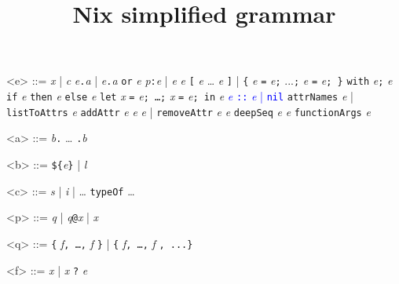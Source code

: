 \documentclass{article}
\title{Nix simplified grammar}
\date{}
\newcommand{\stx}[1]{\texttt{#1}} %
\newcommand{\meta}[1]{\emph{#1}} %
\def\e/{\meta{e}}
\def\a/{\meta{a}}
\def\b/{\meta{b}}
\def\c/{\meta{c}}
\def\p/{\meta{p}}
\def\q/{\meta{q}}
\def\f/{\meta{f}}
\def\x/{\meta{x}}
\begin{document}
\maketitle{}

\begin{grammar}
<e> ::=
    \x/ | \c/
  \alt \e/\stx{.}\a/ | \e/\stx{.}\a/ \stx{or} \e/
  \alt \p/\stx{:}\e/ | \e/ \e/
  \alt \stx{[} \e/ \ldots{} \e/ \stx{]} | \stx{\{} \e/ \stx{=} \e/\stx{;} ...\stx{;} \e/ \stx{=} \e/\stx{; \}}
  \alt \stx{with} \e/\stx{;} \e/
  \alt \stx{if} \e/ \stx{then} \e/ \stx{else} \e/
  \alt \stx{let} \x/ \stx{=} \e/\stx{; \ldots{};} \x/ \stx{=} \e/\stx{; in} \e/
  \textcolor{blue}{\alt \e/ \stx{::} \e/ | \stx{nil}}
  \alt \stx{attrNames} \e/ | \stx{listToAttrs} \e/
  \alt \stx{addAttr} \e/ \e/ \e/ | \stx{removeAttr} \e/ \e/
  \alt \stx{deepSeq} \e/ \e/
  \alt \stx{functionArgs} \e/

<a> ::= \b/\stx{.} \ldots{} \stx{.}\b/

<b> ::= \stx{\$\{}\e/\stx{\}} | \meta{l}

<c> ::= \meta{s} | \meta{i} | \ldots{}
  \alt \stx{typeOf}
  \alt \ldots{}

<p> ::= \q/ | \q/\stx{@}\x/ | \x/

<q> ::= \stx{\{} \f/\stx{, \ldots{},} \f/ \stx{\}} | \stx{\{} \f/\stx{, \ldots{},} \f/ \stx{, ...\}}

<f> ::= \x/ | \x/ \stx{?} \e/

\end{grammar}
\end{document}
